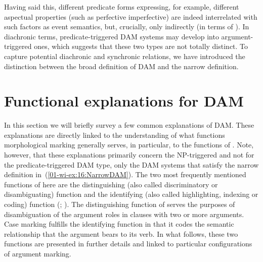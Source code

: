 \documentclass[output=paper]{LSP/langsci}
\begin{document}
\noindent Having said this, different predicate forms expressing, for example, different aspectual properties (such as perfective \vs imperfective) are indeed interrelated with such factors as event semantics, but, crucially, only indirectly (\eg in terms of \citealt{Hopperetal1980Transitivity}). 
In diachronic terms, predicate-triggered DAM systems may develop into argument-triggered ones, which suggests that these two types are not totally distinct. 
To capture potential diachronic and synchronic relations, we have introduced the distinction between the broad definition of DAM and the narrow definition. 

\section{Functional explanations for DAM}
\label{01-wi-sec:4-Functional}

In this section we will briefly survey a few common explanations of DAM. 
These explanations are directly linked to the understanding of what functions morphological marking generally serves, in particular, to the functions of . 
Note, however, that these explanations primarily concern the NP-triggered and not for the predicate-triggered DAM type, \ie only the DAM systems that satisfy the narrow definition in~(\ref{01-wi-ex:16:NarrowDAM}). 
The two most frequently mentioned functions of  here are the distinguishing (also called discriminatory or disambiguating) function and the identifying (also called highlighting, indexing or coding) function (\cf \citealt{Dixon1979Ergativity, Dixon1994Ergativity, Mallinsonetal1981Language, Comrie1989Language, Song2001Linguistic, Hoopetal2008Case-marking, Siewierskaetal2009Case}; \citealt[3--8]{Dalrympleetal2011Objects}). 
The distinguishing function of  serves the purposes of disambiguation of the argument roles in clauses with two or more arguments. 
Case marking fulfills the identifying function in that it codes the semantic relationship that the argument bears to its verb. 
In what follows, these two functions are presented in further details and linked to particular configurations of argument marking.
\end{document}

